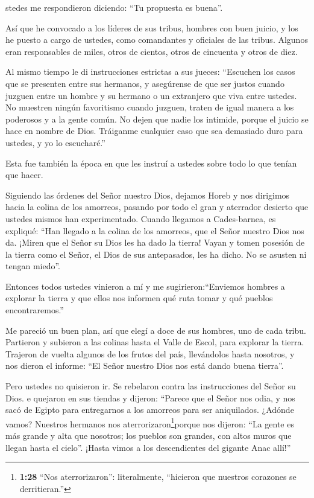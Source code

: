  stedes me respondieron diciendo: ``Tu propuesta es
buena''.

 Así que he convocado a los líderes de sus tribus, hombres
con buen juicio, y los he puesto a cargo de ustedes, como comandantes y
oficiales de las tribus. Algunos eran responsables de miles, otros de
cientos, otros de cincuenta y otros de diez.

 Al mismo tiempo le di instrucciones estrictas a sus
jueces: ``Escuchen los casos que se presenten entre sus hermanos, y
asegúrense de que ser justos cuando juzguen entre un hombre y su hermano
o un extranjero que viva entre ustedes.  No muestren ningún
favoritismo cuando juzguen, traten de igual manera a los poderosos y a
la gente común. No dejen que nadie los intimide, porque el juicio se
hace en nombre de Dios. Tráiganme cualquier caso que sea demasiado duro
para ustedes, y yo lo escucharé.''

 Esta fue también la época en que les instruí a ustedes
sobre todo lo que tenían que hacer.

 Siguiendo las órdenes del Señor nuestro Dios, dejamos
Horeb y nos dirigimos hacia la colina de los amorreos, pasando por todo
el gran y aterrador desierto que ustedes mismos han experimentado.
Cuando llegamos a Cades-barnea,  es expliqué: ``Han llegado
a la colina de los amorreos, que el Señor nuestro Dios nos da.
 ¡Miren que el Señor su Dios les ha dado la tierra! Vayan y
tomen posesión de la tierra como el Señor, el Dios de sus antepasados,
les ha dicho. No se asusten ni tengan miedo''.

 Entonces todos ustedes vinieron a mí y me
sugirieron:``Enviemos hombres a explorar la tierra y que ellos nos
informen qué ruta tomar y qué pueblos encontraremos.''

 Me pareció un buen plan, así que elegí a doce de sus
hombres, uno de cada tribu.  Partieron y subieron a las
colinas hasta el Valle de Escol, para explorar la tierra. 
Trajeron de vuelta algunos de los frutos del país, llevándolos hasta
nosotros, y nos dieron el informe: ``El Señor nuestro Dios nos está
dando buena tierra''.

 Pero ustedes no quisieron ir. Se rebelaron contra las
instrucciones del Señor su Dios.  e quejaron en sus tiendas
y dijeron: ``Parece que el Señor nos odia, y nos sacó de Egipto para
entregarnos a los amorreos para ser aniquilados.  ¿Adónde
vamos? Nuestros hermanos nos aterrorizaron\footnote{\textbf{1:28} ``Nos
  aterrorizaron'': literalmente, ``hicieron que nuestros corazones se
  derritieran.''}porque nos dijeron: ``La gente es más grande y alta que
nosotros; los pueblos son grandes, con altos muros que llegan hasta el
cielo''. ¡Hasta vimos a los descendientes del gigante Anac allí!''


